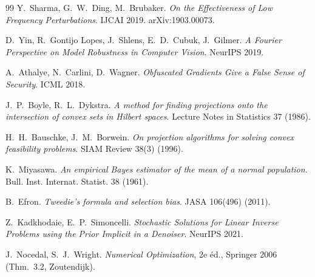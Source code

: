 \documentclass[11pt,a4paper]{article}
\theoremstyle{plain}
\theoremstyle{definition}
\theoremstyle{remark}
\begin{document}
\begin{thebibliography}{99}
 Y.~Sharma, G.~W.~Ding, M.~Brubaker.
\emph{On the Effectiveness of Low Frequency Perturbations}. IJCAI 2019. arXiv:1903.00073.

 D.~Yin, R.~Gontijo Lopes, J.~Shlens, E.~D.~Cubuk, J.~Gilmer.
\emph{A Fourier Perspective on Model Robustness in Computer Vision}. NeurIPS 2019.

 A.~Athalye, N.~Carlini, D.~Wagner.
\emph{Obfuscated Gradients Give a False Sense of Security}. ICML 2018.

 J.~P.~Boyle, R.~L.~Dykstra.
\emph{A method for finding projections onto the intersection of convex sets in Hilbert spaces}. Lecture Notes in Statistics 37 (1986).

 H.~H.~Bauschke, J.~M.~Borwein.
\emph{On projection algorithms for solving convex feasibility problems}. SIAM Review 38(3) (1996).

 K.~Miyasawa.
\emph{An empirical Bayes estimator of the mean of a normal population}. Bull. Inst. Internat. Statist. 38 (1961).

 B.~Efron.
\emph{Tweedie's formula and selection bias}. JASA 106(496) (2011).

 Z.~Kadkhodaie, E.~P.~Simoncelli.
\emph{Stochastic Solutions for Linear Inverse Problems using the Prior Implicit in a Denoiser}. NeurIPS 2021.

 J.~Nocedal, S.~J.~Wright.
\emph{Numerical Optimization}, 2e éd., Springer 2006 (Thm.~3.2, Zoutendijk).

\end{thebibliography}
\end{document}

